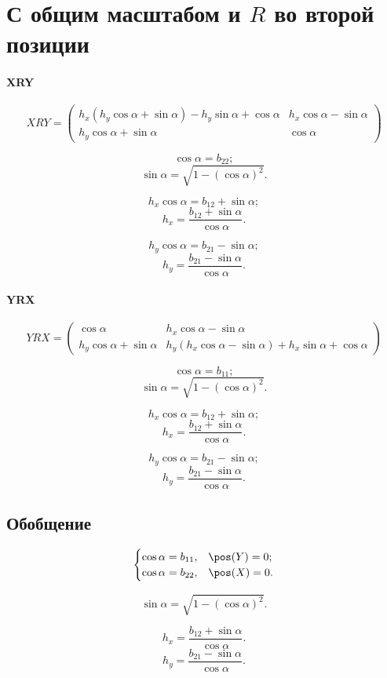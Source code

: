 \section{С общим масштабом и $R$ во второй позиции}
\paragraph{XRY}

\[
XRY =
\begin{pmatrix}
	{h_x} \left( {h_y} \cos\alpha + \sin\alpha\right) - {h_y}\sin\alpha + \cos\alpha &
	{h_x} \cos\alpha - \sin\alpha\\
	{h_y} \cos\alpha + \sin\alpha & 
	\cos\alpha
\end{pmatrix}
\]

$$\cos\alpha = b_{22};$$
$$\sin\alpha = \sqrt{1- (\cos\alpha)^2}.$$

$${h_x} \cos\alpha = b_{12} + \sin\alpha;$$
$$h_x = \frac{b_{12} + \sin\alpha}{\cos\alpha}.$$

$${h_y} \cos\alpha = b_{21} - \sin\alpha;$$ 
$$h_y = \frac{b_{21} - \sin\alpha}{\cos\alpha}.$$


\paragraph{YRX}

\[
YRX = 
\begin{pmatrix}
	\cos\alpha & 
	{h_x} \cos\alpha - \sin\alpha\\
	{h_y} \cos\alpha + \sin\alpha & 
	{h_y} \left( {h_x}\cos\alpha - \sin\alpha\right) + {h_x}\sin\alpha + \cos\alpha
\end{pmatrix}
\]

$$\cos\alpha = b_{11};$$
$$\sin\alpha = \sqrt{1- (\cos\alpha)^2}.$$

$${h_x} \cos\alpha = b_{12} + \sin\alpha;$$
$$h_x = \frac{b_{12} + \sin\alpha}{\cos\alpha}.$$

$${h_y} \cos\alpha = b_{21} - \sin\alpha;$$ 
$$h_y = \frac{b_{21} - \sin\alpha}{\cos\alpha}.$$


\subsection{Обобщение}

$$\begin{cases}
	\cos\alpha = b_{11}, & \pos(Y) = 0;\\
	\cos\alpha = b_{22}, & \pos(X) = 0.
\end{cases}$$

$$\sin\alpha = \sqrt{1- (\cos\alpha)^2}.$$

$$h_x = \frac{b_{12} + \sin\alpha}{\cos\alpha}.$$
$$h_y = \frac{b_{21} - \sin\alpha}{\cos\alpha}.$$
